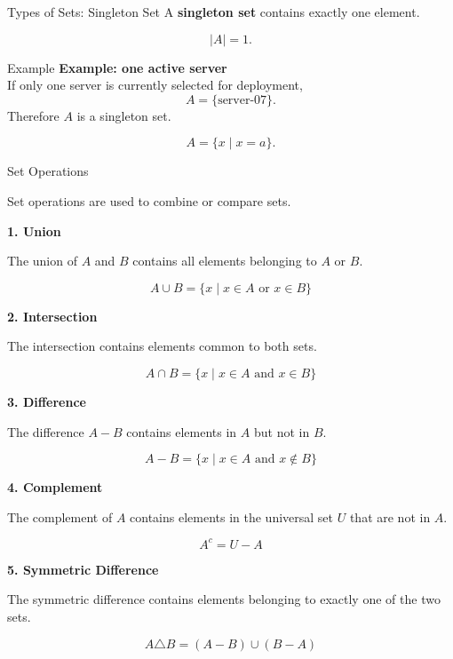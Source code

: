 \documentclass[aspectratio=169,11pt]{beamer}
\newcommand{\examplebox}[2]{
\begin{block}{Example}
\textbf{#1}\\[-1mm]
#2
\end{block}
}
\begin{document}
\begin{frame}{Types of Sets: Singleton Set}
A \textbf{singleton set} contains exactly one element.

\[
|A|=1.
\]

\examplebox{Example: one active server}{
If only one server is currently selected for deployment,
\[
A=\{\text{server-07}\}.
\]
Therefore $A$ is a singleton set.
}

\[
A=\{x\mid x=a\}.
\]
\end{frame}
\begin{frame}{Set Operations}

Set operations are used to combine or compare sets.

\vspace{0.3cm}

\textbf{1. Union}

The union of $A$ and $B$ contains all elements belonging to $A$ or $B$.

\[
A\cup B=\{x\mid x\in A\text{ or }x\in B\}
\]

\vspace{0.2cm}

\textbf{2. Intersection}

The intersection contains elements common to both sets.

\[
A\cap B=\{x\mid x\in A\text{ and }x\in B\}
\]

\vspace{0.2cm}

\textbf{3. Difference}

The difference $A-B$ contains elements in $A$ but not in $B$.

\[
A-B=\{x\mid x\in A\text{ and }x\notin B\}
\]

\end{frame}

\textbf{4. Complement}

The complement of $A$ contains elements in the universal set $U$
that are not in $A$.

\[
A^c=U-A
\]

\vspace{0.4cm}

\textbf{5. Symmetric Difference}

The symmetric difference contains elements belonging to exactly
one of the two sets.

\[
A\triangle B=(A-B)\cup(B-A)
\]
\end{document}
